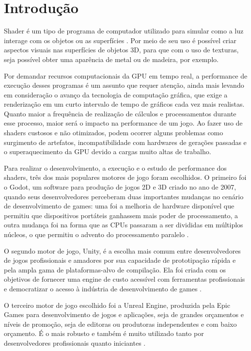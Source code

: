 \chapter{Introdução}
\label{cap:introducao}

Shader é um tipo de programa de computador utilizado para simular como a luz interage com os objetos ou as superfícies \cite{unityShaders}. Por meio de seu uso é possível criar aspectos visuais nas superfícies de objetos 3D, para que com o uso de texturas, seja possível obter uma aparência de metal ou de madeira, por exemplo.

Por demandar recursos computacionais da GPU em tempo real, a performance de execução desses programas é um assunto que requer atenção, ainda mais levando em consideração o avanço da tecnologia de computação gráfica, que exige a renderização em um curto intervalo de tempo de gráficos cada vez mais realistas. Quanto maior a frequência de realização de cálculos e processamentos durante esse processo, maior será o impacto na performance de um jogo. Ao fazer uso de shaders custosos e não otimizados, podem ocorrer alguns problemas como surgimento de artefatos, incompatibilidade com hardwares de gerações passadas e o superaquecimento da GPU devido a cargas muito altas de trabalho. 

Para realizar o desenvolvimento, a execução e o estudo de performance dos shaders, três dos mais populares motores de jogo foram escolhidos. O primeiro foi o Godot, um software para produção de jogos 2D e 3D criado no ano de 2007, quando seus desenvolvedores perceberam duas importantes mudanças no cenário de desenvolvimento de games: uma foi a melhoria de hardware disponível que permitiu que dispositivos portáteis ganhassem mais poder de processamento, a outra mudança foi na forma que as CPUs passaram a ser divididas em múltiplos núcleos, o que permitiu o advento do processamento paralelo \cite{godotEngine}.

O segundo motor de jogo, Unity, é a escolha mais comum entre desenvolvedores de jogos profissionais e amadores por sua capacidade de prototipação rápida e pela ampla gama de plataformas-alvo de compilação. Ela foi criada com os objetivos de fornecer uma engine de custo acessível com ferramentas profissionais e democratizar o acesso à indústria de desenvolvimento de games \cite{unityHistory}.

O terceiro motor de jogo escolhido foi a Unreal Engine, produzida pela Epic Games para desenvolvimento de jogos e aplicações, seja de grandes orçamentos e níveis de promoção, seja de editoras ou produtoras independentes e com baixo orçamento. É o mais robusto e também é muito utilizado tanto por desenvolvedores profissionais quanto iniciantes \cite{unrealEngine}.

